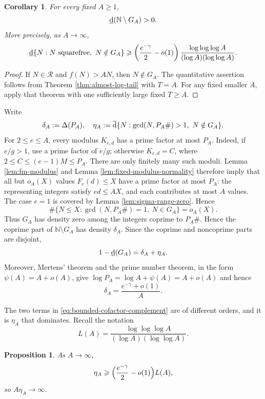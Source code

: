 \documentclass[11pt,letterpaper,reqno]{amsart}
\numberwithin{equation}{section}
\newtheorem{proposition}[theorem]{Proposition}
\newtheorem{corollary}[theorem]{Corollary}
\theoremstyle{remark}
\newcommand{\N}{\mathbb{N}}
\newcommand{\Rcal}{\mathcal{R}}
\newcommand{\lowerdens}{\underline{\textup{d}}}
\newcommand{\upperdens}{\overline{\textup{d}}}
\renewcommand{\leq}{\leqslant}
\renewcommand{\geq}{\geqslant}
\begin{document}
\begin{corollary}
For every fixed $A\geq1$,
\[
 \lowerdens(\N\setminus G_A)>0.
\]
More precisely, as $A\to\infty$,
\begin{equation}\label{eq:fixed-cofactor-defect}
 \lowerdens\{N:N\text{ squarefree},\ N\notin G_A\}
 \geq\left(\frac{e^{-\gamma}}2-o(1)\right)
 \frac{\log\log\log A}{(\log A)(\log\log A)}.
\end{equation}
\end{corollary}

\begin{proof}
If $N\in\Rcal$ and $f(N)>AN$, then $N\notin G_A$. The quantitative
assertion follows from Theorem \ref{thm:almost-log-tail} with $T=A$.
For any fixed smaller $A$, apply that theorem with one sufficiently large
fixed $T\geq A$.
\end{proof}

Write
\[
 \delta_A:=\Delta(P_A),\quad
 \eta_A:=\upperdens\{N:\gcd(N,P_A\#)>1,\ N\notin G_A\}.
\]
For $2\leq e\leq A$, every modulus $K_{e,d}$ has a prime
factor at most $P_A$. Indeed, if $e/g>1$, use a prime factor of $e/g$;
otherwise $K_{e,d}=C$, where $2\leq C\leq(e-1)M\leq P_A$.
There are only finitely many such moduli. Lemma \ref{lem:fm-modulus}
and Lemma \ref{lem:fixed-modulus-normality} therefore imply that all but $o_A(X)$
values $F_e(d)\leq X$ have a prime factor at most $P_A$: the representing
integers satisfy $ed\leq AX$, and each contributes at most $A$ values.
The case $e=1$ is covered by Lemma \ref{lem:sigma-range-zero}. Hence
\[
 \#\{N\leq X:\gcd(N,P_A\#)=1,\ N\in G_A\}=o_A(X).
\]
Thus $G_A$ has density zero among the integers coprime to
$P_A\#$. Hence the coprime part of $\N\setminus G_A$ has density
$\delta_A$. Since the coprime and noncoprime parts are disjoint,
\begin{equation}\label{eq:bounded-cofactor-complement}
 1-\lowerdens(G_A)=\delta_A+\eta_A.
\end{equation}
Moreover, Mertens' theorem and the prime number theorem, in the form
$\psi(A)=A+o(A)$, give
$\log P_A=\log A+\psi(A)=A+o(A)$ and hence
\begin{equation}\label{eq:delta-A-asymptotic}
 \delta_A=\frac{e^{-\gamma}+o(1)}A.
\end{equation}

The two terms in \eqref{eq:bounded-cofactor-complement} are of different
orders, and it is $\eta_A$ that dominates. Recall the notation
\[
 L(A)=\frac{\log\log\log A}{(\log A)(\log\log A)} .
\]

\begin{proposition}
As $A\to\infty$,
\[
 \eta_A\geq\Bigl(\frac{e^{-\gamma}}2-o(1)\Bigr)L(A),
\]
so $A\eta_A\to\infty$.
\end{proposition}
\end{document}
